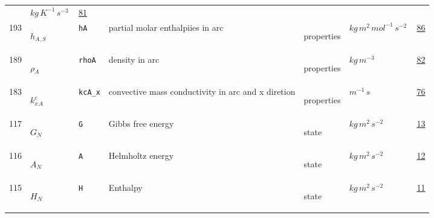 \begin{longtable}{|p{1cm}|p{2.5cm}|p{4.5cm}|p{8cm}|p{3.0cm}|p{3cm}|p{1cm}|}
             & $ kg \,K^{-1} \,s^{-3} \, $
             &                 \hyperlink{"e:81"}{ 81 }
                 \\
            193
             & \hypertarget{"v:193"}{ $ {h}{_{A, S}} $}
             & \verb|hA|
             & partial molar enthalpiies in arc
             & \begin{lay}properties \end{lay}
             & $ kg \,m^{2} \,mol^{-1} \,s^{-2} \, $
             &                 \hyperlink{"e:86"}{ 86 }
                 \\
            189
             & \hypertarget{"v:189"}{ $ {{\rho}}{_{A}} $}
             & \verb|rhoA|
             & density in arc
             & \begin{lay}properties \end{lay}
             & $ kg \,m^{-3} \, $
             &                 \hyperlink{"e:82"}{ 82 }
                 \\
            183
             & \hypertarget{"v:183"}{ $ {{k^c_x}}{_{A}} $}
             & \verb|kcA_x|
             & convective mass conductivity in arc and x diretion
             & \begin{lay}properties \end{lay}
             & $ m^{-1} \,s \, $
             &                 \hyperlink{"e:76"}{ 76 }
                 \\
            117
             & \hypertarget{"v:117"}{ $ {G}{_{N}} $}
             & \verb|G|
             & Gibbs free energy
             & \begin{lay}state \end{lay}
             & $ kg \,m^{2} \,s^{-2} \, $
             &                 \hyperlink{"e:13"}{ 13 }
                 \\
            116
             & \hypertarget{"v:116"}{ $ {A}{_{N}} $}
             & \verb|A|
             & Helmholtz energy
             & \begin{lay}state \end{lay}
             & $ kg \,m^{2} \,s^{-2} \, $
             &                 \hyperlink{"e:12"}{ 12 }
                 \\
            115
             & \hypertarget{"v:115"}{ $ {H}{_{N}} $}
             & \verb|H|
             & Enthalpy
             & \begin{lay}state \end{lay}
             & $ kg \,m^{2} \,s^{-2} \, $
             &                 \hyperlink{"e:11"}{ 11 }

\end{longtable}
